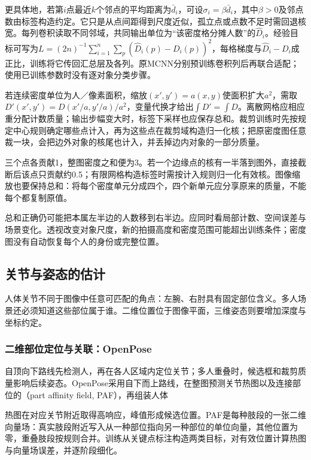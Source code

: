 更具体地，若第$i$点最近$k$个邻点的平均距离为$\bar d_i$，可设$\sigma_i=\beta\bar d_i$，其中$\beta>0$及邻点数由标签构造约定。它只是从点间距得到尺度近似，孤立点或点数不足时需回退核宽。每列卷积读取不同邻域，共同输出单位为“该密度格分摊人数”的$\hat D_i$。经验目标可写为$L=(2n)^{-1}\sum_{i=1}^n\sum_p(\hat D_i(p)-D_i(p))^2$，每格梯度与$\hat D_i-D_i$成正比，训练将它传回汇总层及各列。原MCNN分别预训练卷积列后再联合适配；使用已训练参数时没有逐对象分类步骤。

若连续密度单位为人／像素面积，缩放$(x',y')=a(x,y)$使面积扩大$a^2$，需取$D'(x',y')=D(x'/a,y'/a)/a^2$，变量代换才给出$\int D'=\int D$。离散网格应相应重分配计数质量；输出步幅变大时，标签下采样也应保存总和。裁剪训练时先按规定中心规则确定哪些点计入，再为这些点在裁剪域构造归一化核；把原密度图任意裁一块，会把边外对象的核尾也计入，并丢掉边内对象的一部分质量。

三个点各贡献1，整图密度之和便为3。若一个边缘点的核有一半落到图外，直接截断后该点只贡献约0.5；有限网格构造标签时需按计入规则归一化有效核。图像缩放也要保持总和：将每个密度单元分成四个，四个新单元应分享原来的质量，不能每个都复制原值。

总和正确仍可能把本属左半边的人数移到右半边。应同时看局部计数、空间误差与场景变化。透视改变对象尺度，新的拍摄高度和密度范围可能超出训练条件；密度图没有自动恢复每个人的身份或完整位置。

\subsection{关节与姿态的估计}
\label{sec:vision-recognition-pose}

人体关节不同于图像中任意可匹配的角点：左腕、右肘具有固定部位含义。多人场景还必须知道这些部位属于谁。二维位置位于图像平面，三维姿态则要增加深度与坐标约定。

\subsubsection{二维部位定位与关联：OpenPose}
\label{sec:vision-recognition-openpose}

自顶向下路线先检测人，再在各人区域内定位关节；多人重叠时，候选框和裁剪质量影响后续姿态。OpenPose采用自下而上路线，在整图预测关节热图以及连接部位的（part affinity field, PAF），再组装人体

热图在对应关节附近取得高响应，峰值形成候选位置。PAF是每种肢段的一张二维向量场：真实肢段附近写入从一种部位指向另一种部位的单位向量，其他位置为零，重叠肢段按规则合并。训练从关键点标注构造两类目标，对有效位置计算热图与向量场误差，并逐阶段细化。

